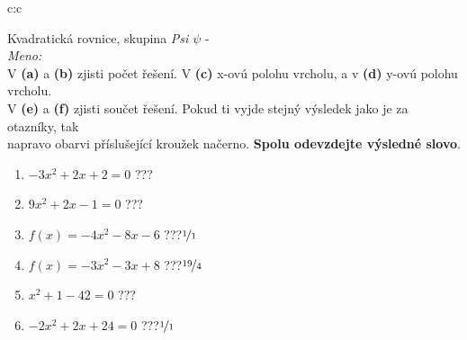 \documentclass[10pt]{report}
\begin{document}
\clearpage
\thispagestyle{empty}
\begin{tabular}{c:c}
\begin{minipage}[c][99mm][t]{0.49\linewidth}
\begin{center}
\vspace{7mm}
{\huge Kvadratická rovnice, skupina \textit{Psi $\psi$} -}\\[4.5mm]
\textit{Meno:}\phantom{xxxxxxxxxxxxxxxxxxxxxxxxxxxxxxxxxxxxxxxxxxxxxxxxxxxxxxxxxxxxxxxxx}\\[3.5mm]
V \textbf{(a)} a \textbf{(b)} zjisti počet řešení. V \textbf{(c)} x-ovú polohu vrcholu, a v \textbf{(d)} y-ovú polohu vrcholu.\\V \textbf{(e)} a \textbf{(f)} zjisti součet řešení. Pokud ti vyjde stejný výsledek jako je za otazníky, tak\\napravo obarvi příslušející kroužek načerno. \textbf{Spolu odevzdejte výsledné slovo}.\\[3mm]
\begin{minipage}{0.77\linewidth}
\begin{center}
\begin{varwidth}{\textwidth}
\begin{enumerate}
\large
\item $-3x^2+2x+2=0$\quad \dotfill\; ???\;\dotfill {}
\item $9x^2+2x-1=0$\quad \dotfill\; ???\;\dotfill {}
\item $f(x)=-4x^2-8x-6$\quad \dotfill\; ???\;\dotfill \quad $\nicefrac{1}{1}$
\item $f(x)=-3x^2-3x+8$\quad \dotfill\; ???\;\dotfill \quad $\nicefrac{19}{4}$
\item $x^2+1-42=0$\quad \dotfill\; ???\;\dotfill {}
\item $-2x^2+2x+24=0$\quad \dotfill\; ???\;\dotfill \quad $\nicefrac{1}{1}$
\end{enumerate}
\end{varwidth}
\end{center}
\end{minipage}

\end{center}
\end{minipage}
\end{tabular}
\end{document}
